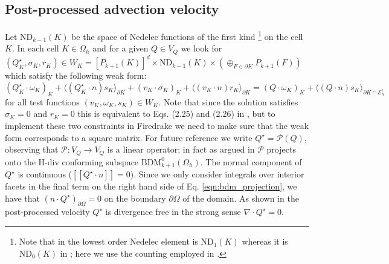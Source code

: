 \documentclass[11pt]{article}
\newcommand{\jump}[1]{[\![ #1]\!]}
\begin{document}
\subsection{Post-processed advection velocity}
Let $\text{ND}_{k-1}(K)$ be the space of Nedelec functions of the first kind \cite[Section 3.5.1]{Logg2012}\footnote{Note that in \cite{Logg2012} the lowest order Nedelec element is $\text{ND}_{1}(K)$ whereas it is $\text{ND}_{0}(K)$ in \cite{Guzman2016}; here we use the counting employed in \cite{Guzman2016}.} on the cell $K$. In each cell $K\in\Omega_h$ and for a given $Q\in V_Q$ we look for $(Q^\star_K,\sigma_K,r_K) \in W_K = [P_{k+1}(K)]^d\times \text{ND}_{k-1}(K)\times \left(\oplus_{F\in\partial K} P_{k+1}(F)\right)$ which satisfy the following weak form:
\begin{equation}
    (Q^\star_K\cdot  \omega_K)_K + \langle (Q_K^\star\cdot n)s_K\rangle_{\partial K} + (v_K\cdot \sigma_K)_K + \langle (v_K\cdot n)r_K\rangle_{\partial K} = (Q\cdot\omega_K)_K + \langle (Q\cdot n)s_K\rangle_{\partial K\cap \mathcal{E}_h^i}\label{eqn:bdm_projection}
\end{equation}
for all test functions $(v_K,\omega_K,s_K)\in W_K$. Note that since the solution satisfies $\sigma_K=0$ and $r_K=0$ this is equivalent to Eqs. (2.25) and (2.26) in \cite{Guzman2016}, but to implement these two constraints in Firedrake we need to make sure that the weak form corresponds to a square matrix. For future reference we write $Q^\star = \mathcal{P}(Q)$, observing that $\mathcal{P}:V_Q \rightarrow V_Q$ is a linear operator; in fact as argued in \cite{Guzman2016} $\mathcal{P}$ projects onto the H-div conforming subspace $\text{BDM}^0_{k+1}(\Omega_h)$. The normal component of $Q^\star$ is continuous ($\jump{Q^\star\cdot n} = 0$). Since we only consider integrals over interior facets in the final term on the right hand side of Eq. \eqref{eqn:bdm_projection}, we have that $(n\cdot Q^\star)_{\partial \Omega} = 0$ on the boundary $\partial\Omega$ of the domain. As shown in \cite{Guzman2016} the post-processed velocity $Q^\star$ is divergence free in the strong sense $\nabla \cdot Q^\star=0$.
\end{document}
